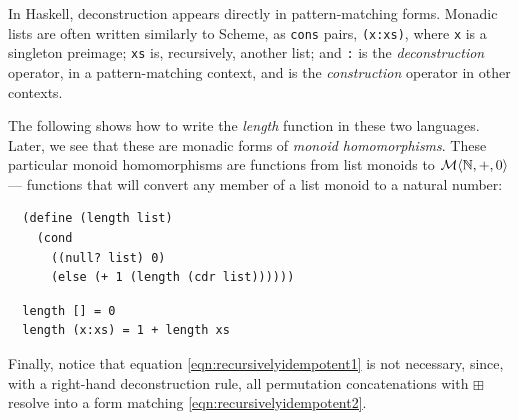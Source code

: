 In Haskell, deconstruction appears directly in pattern-matching forms. Monadic lists are often written similarly to Scheme, as \verb"cons" pairs, \verb"(x:xs)", where \verb"x" is a singleton preimage; \verb"xs" is, recursively, another list; and \verb":" is the \emph{deconstruction} operator, in a pattern-matching context, and is the \emph{construction} operator in other contexts.


The following shows how to write the \emph{length} function in these two languages. Later, we see that these are monadic forms of \emph{monoid homomorphisms}. These particular monoid homomorphisms are functions from list monoids to $\mathcal{M}\langle{\mathbb{N}},{+},{0}\rangle$ --- functions that will convert any member of a list monoid to a natural number:


\begin{verbatim}
  (define (length list)
    (cond
      ((null? list) 0)
      (else (+ 1 (length (cdr list))))))
\end{verbatim}
\begin{verbatim}
  length [] = 0
  length (x:xs) = 1 + length xs
\end{verbatim}


Finally, notice that equation \ref{eqn:recursivelyidempotent1} is not necessary, since, with a right-hand deconstruction rule, all permutation concatenations with $\boxplus$ resolve into a form matching \ref{eqn:recursivelyidempotent2}.


